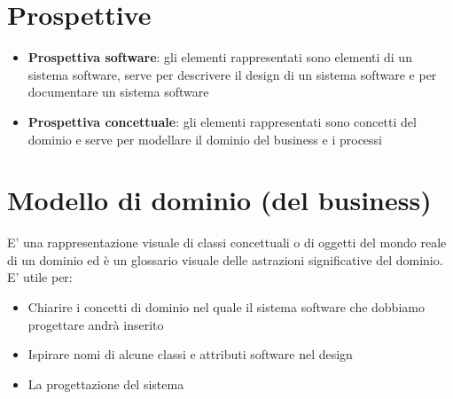 \documentclass[12pt, a4paper]{report}
\begin{document}
\section{Prospettive}
\begin{itemize}
    \item \textbf{Prospettiva software}: gli elementi rappresentati sono elementi di un sistema software, serve per descrivere il design di un sistema software e per documentare un sistema software
    \item \textbf{Prospettiva concettuale}: gli elementi rappresentati sono concetti del dominio e serve per modellare il dominio del business e i processi
\end{itemize}
\section{Modello di dominio (del business)}
E' una rappresentazione visuale di classi concettuali o di oggetti del mondo reale di un dominio ed è un glossario visuale delle astrazioni significative del dominio.\\
E' utile per:
\begin{itemize}
    \item Chiarire i concetti di dominio nel quale il sistema software che dobbiamo progettare andrà inserito
    \item Ispirare nomi di alcune classi e attributi software nel design
    \item La progettazione del sistema
\end{itemize}
\end{document}
